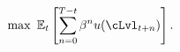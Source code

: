   \begin{equation}\label{eq:MaxProb}
    \max~\Ex_{\prd}\left[\sum_{n=0}^{\trmT-\prd}\DiscFac^{n} \uFunc({\cLvl}_{\prd+n})\right].
  \end{equation}

